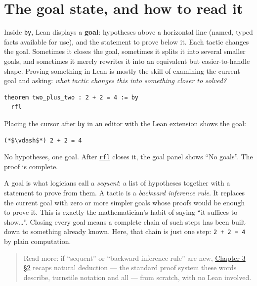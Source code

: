 \section{The goal state, and how to read it}\label{sec:04-tactics:01-goal-state:1}

Inside \texttt{by}, Lean displays a \textbf{goal}: hypotheses above a horizontal line (named, typed facts available for use), and the statement to prove below it. Each tactic changes the goal. Sometimes it closes the goal, sometimes it splits it into several smaller goals, and sometimes it merely rewrites it into an equivalent but easier-to-handle shape. Proving something in Lean is mostly the skill of examining the current goal and asking: \emph{what tactic changes this into something closer to solved?}

\begin{lstlisting}
theorem two_plus_two : 2 + 2 = 4 := by
  rfl
\end{lstlisting}

Placing the cursor after \texttt{by} in an editor with the Lean extension shows the goal:

\begin{lstlisting}
(*$\vdash$*) 2 + 2 = 4
\end{lstlisting}

No hypotheses, one goal. After \href{https://lean-lang.org/doc/reference/latest/Tactic-Proofs/Tactic-Reference/}{\texttt{rfl}} closes it, the goal panel shows ``No goals''. The proof is complete.

\begin{mathreading}

A goal is what logicians call a \emph{sequent}: a list of hypotheses together with a statement to prove from them. A tactic is a \emph{backward inference rule}. It replaces the current goal with zero or more simpler goals whose proofs would be enough to prove it. This is exactly the mathematician's habit of saying ``it suffices to show\ldots{}''. Closing every goal means a complete chain of such steps has been built down to something already known. Here, that chain is just one step: \texttt{2 + 2 = 4} by plain computation.

\end{mathreading}

\begin{quote}
Read more: if ``sequent'' or ``backward inference rule'' are new, \hyperref[sec:03-propositions-and-proofs:02-logic-recap:1]{Chapter 3 §2} recaps natural deduction --- the standard proof system these words describe, turnstile notation and all --- from scratch, with no Lean involved.
\end{quote}

